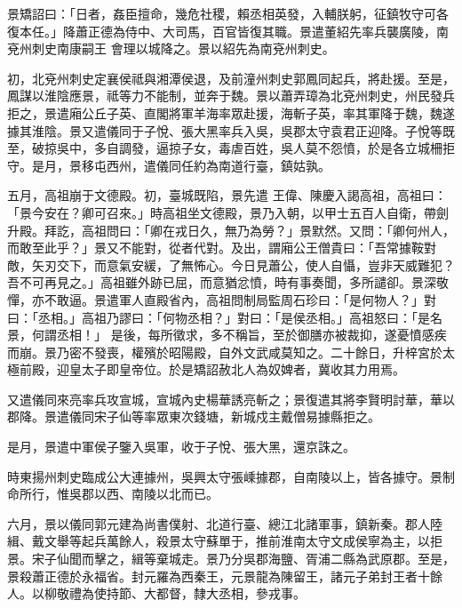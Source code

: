 \begin{pinyinscope}
 景矯詔曰：「日者，姦臣擅命，幾危社稷，賴丞相英發，入輔朕躬，征鎮牧守可各復本任。」降蕭正德為侍中、大司馬，百官皆復其職。景遣董紹先率兵襲廣陵，南兗州刺史南康嗣王
 會理以城降之。景以紹先為南兗州刺史。



 初，北兗州刺史定襄侯祗與湘潭侯退，及前潼州刺史郭鳳同起兵，將赴援。至是，鳳謀以淮陰應景，祗等力不能制，並奔于魏。景以蕭弄璋為北兗州刺史，州民發兵拒之，景遣廂公丘子英、直閣將軍羊海率眾赴援，海斬子英，率其軍降于魏，魏遂據其淮陰。景又遣儀同于子悅、張大黑率兵入吳，吳郡太守袁君正迎降。子悅等既至，破掠吳中，多自調發，逼掠子女，毒虐百姓，吳人莫不怨憤，於是各立城柵拒守。是月，景移屯西州，遣儀同任約為南道行臺，鎮姑孰。



 五月，高祖崩于文德殿。初，臺城既陷，景先遣
 王偉、陳慶入謁高祖，高祖曰：「景今安在？卿可召來。」時高祖坐文德殿，景乃入朝，以甲士五百人自衛，帶劍升殿。拜訖，高祖問曰：「卿在戎日久，無乃為勞？」景默然。又問：「卿何州人，而敢至此乎？」景又不能對，從者代對。及出，謂廂公王僧貴曰：「吾常據鞍對敵，矢刃交下，而意氣安緩，了無怖心。今日見蕭公，使人自懾，豈非天威難犯？吾不可再見之。」高祖雖外跡已屈，而意猶忿憤，時有事奏聞，多所譴卻。景深敬憚，亦不敢逼。景遣軍人直殿省內，高祖問制局監周石珍曰：「是何物人？」對曰：「丞相。」高祖乃謬曰：「何物丞相？」對曰：「是侯丞相。」高祖怒曰：「是名景，何謂丞相！」
 是後，每所徵求，多不稱旨，至於御膳亦被裁抑，遂憂憤感疾而崩。景乃密不發喪，權殯於昭陽殿，自外文武咸莫知之。二十餘日，升梓宮於太極前殿，迎皇太子即皇帝位。於是矯詔赦北人為奴婢者，冀收其力用焉。



 又遣儀同來亮率兵攻宣城，宣城內史楊華誘亮斬之；景復遣其將李賢明討華，華以郡降。景遣儀同宋子仙等率眾東次錢塘，新城戍主戴僧易據縣拒之。



 是月，景遣中軍侯子鑒入吳軍，收于子悅、張大黑，還京誅之。



 時東揚州刺史臨成公大連據州，吳興太守張嵊據郡，自南陵以上，皆各據守。景制命所行，惟吳郡以西、南陵以北而已。



 六月，景以儀同郭元建為尚書僕射、北道行臺、總江北諸軍事，鎮新秦。郡人陸緝、戴文舉等起兵萬餘人，殺景太守蘇單于，推前淮南太守文成侯寧為主，以拒景。宋子仙聞而擊之，緝等棄城走。景乃分吳郡海鹽、胥浦二縣為武原郡。至是，景殺蕭正德於永福省。封元羅為西秦王，元景龍為陳留王，諸元子弟封王者十餘人。以柳敬禮為使持節、大都督，隸大丞相，參戎事。




\end{pinyinscope}
